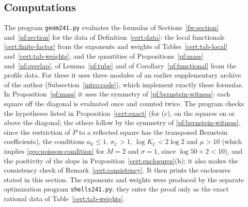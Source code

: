 \documentclass[11pt]{amsart}
\numberwithin{equation}{section}
\theoremstyle{definition}
\theoremstyle{remark}
\newcommand{\R}{\mathbb R}
\newcommand{\C}{\mathbb C}
\begin{document}
\subsection{Computations}\label{cert:computations}
The program \texttt{geom241.py} evaluates the formulas of
Sections~\ref{fw:section} and~\ref{pf:section} for the data of
Definition~\ref{cert:data}: the local functionals
\eqref{cert:finite-factor} from the exponents and weights of
Tables~\ref{cert:tab-local} and~\ref{cert:tab-weights}, and the
quantities of Propositions~\ref{pf:mass} and~\ref{pf:overlap}, of
Lemma~\ref{pf:tube} and of Corollary~\ref{pf:functional} from the
profile data. For these it uses three modules of an earlier
supplementary archive of the author (Subsection~\ref{intro:code}), which
implement exactly these formulas. In Proposition~\ref{pf:mass} it uses
the symmetry of \eqref{pf:bernstein-witness}: each square off the
diagonal is evaluated once and counted twice. The program checks the
hypotheses listed in Proposition~\ref{cert:exact} (for (c), on the
squares on or above the diagonal; the others follow by the symmetry of
\eqref{pf:bernstein-witness}, since the restriction of $P$ to a reflected
square has the transposed Bernstein coefficients), the conditions
$a_\R\le1$, $\sigma_\C>1$, $\log K_\C<2\log2$ and $\mu>10$ (which
implies \eqref{geo:poisson-condition} for $M=2$ and $\sigma=1$, since
$\log50+2<10$), and the positivity of the slope in
Proposition~\ref{cert:enclosures}(h); it also makes the consistency
check of Remark~\ref{cert:consistency}. It then prints the enclosures
stated in this section. The exponents and weights were produced by the
separate optimization program \texttt{shells241.py}; they enter the
proof only as the exact rational data of Table~\ref{cert:tab-weights}.
\end{document}
